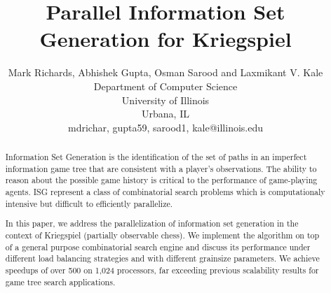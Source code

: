 \documentclass[10pt, conference, compsocconf]{IEEEtran}
\begin{document}
\title{Parallel Information Set Generation for Kriegspiel 
       }

\author{Mark Richards, Abhishek Gupta, Osman Sarood and Laxmikant V. Kale\\
Department of Computer Science\\ 
University of Illinois\\ 
Urbana, IL\\ {mdrichar, gupta59, sarood1, kale}@illinois.edu\\
}

\maketitle
\thispagestyle{empty}



\begin{abstract}
Information Set Generation is the identification of the set of paths in an
imperfect information game tree that are consistent with a player's
observations.  The ability to reason about the possible game history is
critical to the performance of game-playing agents.  ISG represent a class of
combinatorial search problems which is computationaly intensive but difficult
to efficiently parallelize.

In this paper, we address the parallelization of information set generation in
the context of Kriegspiel (partially observable chess).  We implement the
algorithm on top of a general purpose combinatorial search engine and discuss
its performance under different load balancing strategies and with different
grainsize parameters.  We achieve speedups of over 500 on 1,024 processors, far
exceeding previous scalability results for game tree search applications.
\end{abstract}
\end{document}

